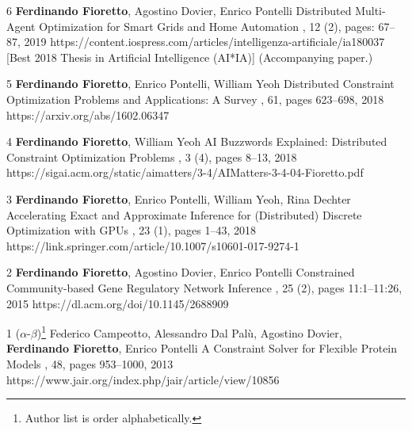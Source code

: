 \begin{pubs}
	\journalentryAwd
	{6}	%
	{{\bf Ferdinando Fioretto}, Agostino Dovier, Enrico Pontelli}
	{Distributed Multi-Agent Optimization for Smart Grids and Home Automation}
	{,  12 (2), pages: 67--87, 2019}
	{https://content.iospress.com/articles/intelligenza-artificiale/ia180037}
	{[Best 2018 Thesis in Artificial Intelligence (AI*IA)]}
	{(Accompanying paper.)}

	\journalentry
	{5}	%
	{{\bf Ferdinando Fioretto}, Enrico Pontelli, William Yeoh}
	{Distributed Constraint Optimization Problems and Applications: A Survey}
	{\JAIR, 61, pages 623--698, 2018} 
	{https://arxiv.org/abs/1602.06347}

	\journalentry 
	{4}	%
	{{\bf Ferdinando Fioretto}, William Yeoh}
	{AI Buzzwords Explained: Distributed Constraint Optimization Problems}
	{, 3 (4), pages 8--13, 2018}
	{https://sigai.acm.org/static/aimatters/3-4/AIMatters-3-4-04-Fioretto.pdf}

	\journalentry 
	{3}	%
	{{\bf Ferdinando Fioretto}, Enrico Pontelli, William Yeoh, Rina Dechter}
	{Accelerating Exact and Approximate Inference for (Distributed) Discrete Optimization with GPUs}
	{, 23 (1), pages 1--43, 2018}
	{https://link.springer.com/article/10.1007/s10601-017-9274-1}

	\journalentry 
	{2}	%
	{{\bf Ferdinando Fioretto}, Agostino Dovier, Enrico Pontelli}
	{Constrained Community-based Gene Regulatory Network Inference}
	{, 25 (2), pages 11:1--11:26, 2015}
	{https://dl.acm.org/doi/10.1145/2688909}

	\journalentry
	{1}	%
	{($\alpha$-$\beta$)\footnote{Author list is order alphabetically.} 
		Federico Campeotto, Alessandro Dal Pal\`{u}, Agostino Dovier,  {\bf Ferdinando Fioretto}, Enrico Pontelli}
	{A Constraint Solver for Flexible Protein Models}
	{\JAIR, 48, pages 953--1000, 2013}
	{https://www.jair.org/index.php/jair/article/view/10856}
\end{pubs}

